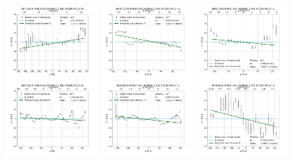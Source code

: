 \begin{figure}
    \centering
    \includegraphics[width=0.31\textwidth]{Images/WLSFITS/CC0/8940-6101.png}
    \includegraphics[width=0.31\textwidth]{Images/WLSFITS/CC0/8945-12703.png}
    \includegraphics[width=0.31\textwidth]{Images/WLSFITS/CC0/8992-1902.png}
    \includegraphics[width=0.31\textwidth]{Images/WLSFITS/CC0/8995-9101.png}
    \includegraphics[width=0.31\textwidth]{Images/WLSFITS/CC0/9029-6103.png}
    \includegraphics[width=0.31\textwidth]{Images/WLSFITS/CC0/9048-6101.png}

\end{figure}
